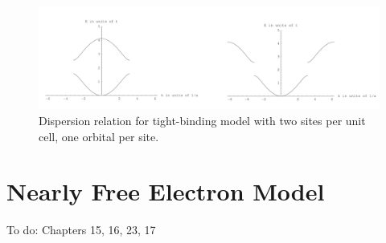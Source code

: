 \documentclass[10pt]{article}
\begin{document}
\begin{figure}
  \centering
    \includegraphics[width=\textwidth]{tb5}
    \caption{Dispersion relation for tight-binding model with two sites per unit cell, one orbital per site.}
\end{figure}

\section{Nearly Free Electron Model}

To do: Chapters 15, 16, 23, 17
\end{document}

